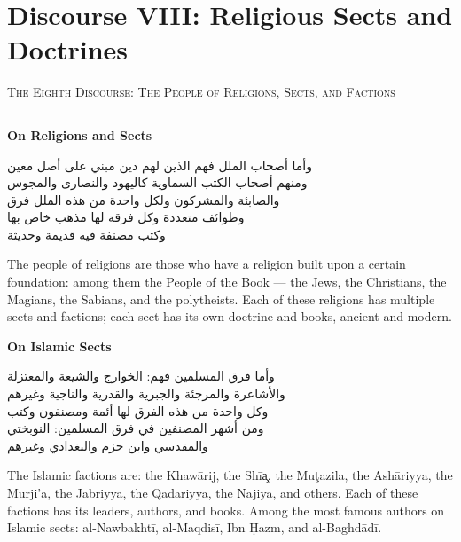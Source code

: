 \documentclass[11pt,a4paper]{article}
\newcommand{\ar}[1]{{\arabicfont\beginR #1\endR}}
\newcommand{\bilingual}[2]{%
  \noindent
  \begin{minipage}[t]{0.47\textwidth}
    \vspace{0pt}
    \begin{flushright}
    {\arabicfont\beginR #1\endR}
    \end{flushright}
  \end{minipage}%
  \hfill\vline\hfill
  \begin{minipage}[t]{0.47\textwidth}
    \vspace{0pt}
    #2
  \end{minipage}%
  \par\vspace{0.8em}
}
\newcommand{\bilingualsection}[2]{%
  \vspace{1em}%
  \noindent
  \begin{minipage}[t]{0.47\textwidth}
    \begin{flushright}
    \textsc{\color{sectioncolor}\ar{#1}}
    \end{flushright}
  \end{minipage}%
  \hfill
  \begin{minipage}[t]{0.47\textwidth}
    \textsc{\color{sectioncolor}#2}
  \end{minipage}%
  \par\vspace{0.5em}\hrule\vspace{0.8em}%
}
\newcommand{\bilingualsubsection}[2]{%
  \vspace{0.6em}%
  \noindent
  \begin{minipage}[t]{0.47\textwidth}
    \begin{flushright}
    \textbf{\color{sectioncolor}\ar{#1}}
    \end{flushright}
  \end{minipage}%
  \hfill
  \begin{minipage}[t]{0.47\textwidth}
    \textbf{\color{sectioncolor}#2}
  \end{minipage}%
  \par\vspace{0.4em}%
}
\begin{document}
\section{Discourse VIII: Religious Sects and Doctrines}
\label{sec:VIII}

\bilingualsection{الفن الثامن في أصحاب الملل والنحل والفرق}{The Eighth Discourse: The People of Religions, Sects, and Factions}

\bilingualsubsection{في الملل والنحل}{On Religions and Sects}

\bilingual
{وأما أصحاب الملل فهم الذين لهم دين مبني على أصل معين\\
ومنهم أصحاب الكتب السماوية كاليهود والنصارى والمجوس\\
والصابئة والمشركون ولكل واحدة من هذه الملل فرق\\
وطوائف متعددة وكل فرقة لها مذهب خاص بها\\
وكتب مصنفة فيه قديمة وحديثة}
{The people of religions are those who have a religion built upon a
certain foundation: among them the People of the Book — the Jews,
the Christians, the Magians, the Sabians, and the polytheists. Each of
these religions has multiple sects and factions; each sect has its own
doctrine and books, ancient and modern.}

\bilingualsubsection{في الفرق الإسلامية}{On Islamic Sects}

\bilingual
{وأما فرق المسلمين فهم: الخوارج والشيعة والمعتزلة\\
والأشاعرة والمرجئة والجبرية والقدرية والناجية وغيرهم\\
وكل واحدة من هذه الفرق لها أئمة ومصنفون وكتب\\
ومن أشهر المصنفين في فرق المسلمين: النوبختي\\
والمقدسي وابن حزم والبغدادي وغيرهم}
{The Islamic factions are: the Khaw\=arij, the Sh\=i\c{a}, the
Mu\c{t}azila, the Ash\=ariyya, the Murji'a, the Jabriyya, the Qadariyya,
the Najiya, and others. Each of these factions has its leaders, authors,
and books. Among the most famous authors on Islamic sects: al-Nawbakht\=i,
al-Maqdis\=i, Ibn \d{H}azm, and al-Baghd\=ad\=i.}

\newpage

\end{document}
